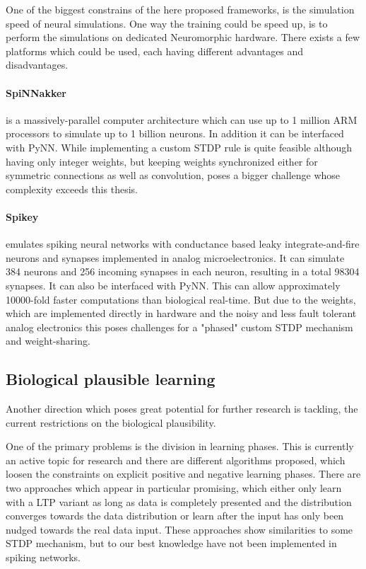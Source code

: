 One of the biggest constrains of the here proposed frameworks, is the simulation speed of neural simulations.
One way the training could be speed up, is to perform the simulations on dedicated Neuromorphic hardware. 
There exists a few platforms which could be used, each having different advantages and disadvantages.

\paragraph{SpiNNakker} is a massively-parallel computer architecture which can use up to 1 million ARM processors to simulate up to 1 billion neurons. 
In addition it can be interfaced with PyNN. 
While implementing a custom STDP rule is quite feasible although having only integer weights, but keeping weights synchronized either for symmetric connections as well as convolution, poses a bigger challenge whose complexity exceeds this thesis.

\paragraph{Spikey} emulates spiking neural networks with conductance based leaky integrate-and-fire neurons and synapses implemented in analog microelectronics.
It can simulate 384 neurons and 256 incoming synapses in each neuron, resulting in a total 98304 synapses.
It can also be interfaced with PyNN.
This can allow approximately 10000-fold faster computations than biological real-time.
But due to the weights, which are implemented directly in hardware and the noisy and less fault tolerant analog electronics this poses challenges for a "phased" custom STDP mechanism and weight-sharing. 

\subsection{Biological plausible learning}

Another direction which poses great potential for further research is tackling, the current restrictions on the biological plausibility.  

One of the primary problems is the division in learning phases.
This is currently an active topic for research and there are different algorithms proposed, which loosen the constraints on explicit positive and negative learning phases.
There are two approaches which appear in particular promising, which either only learn with a LTP variant as long as data is completely presented and the distribution converges towards the data distribution or learn after the input has only been nudged towards the real data input.
These approaches show similarities to some STDP mechanism, but to our best knowledge have not been implemented in spiking networks.

